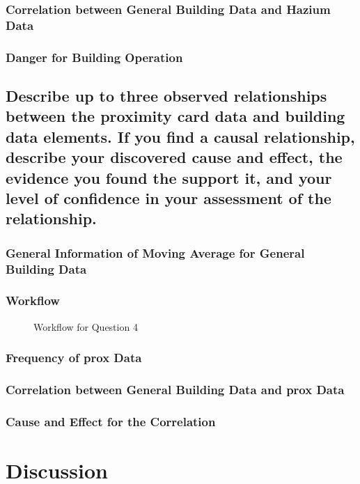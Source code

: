 \documentclass[aps, 10pt, a4paper]{article}
\begin{document}
            \subsubsection{Correlation between General Building Data and Hazium Data}
            
            \subsubsection{Danger for Building Operation}
        
        \subsection[Question 4]{Describe up to three observed relationships between the proximity card data and building data elements. If you find a causal relationship, describe your discovered cause and effect, the evidence you found the support it, and your level of confidence in your assessment of the relationship.}
            \label{sec:question4}
            \subsubsection{General Information of Moving Average for General Building Data}
            
            \subsubsection{Workflow}
                \begin{figure}[htbp]
                    \centering
                    \begin{tikzpicture}[node distance = 2cm, auto]
                    \end{tikzpicture}
                    \caption{Workflow for Question 4}
                    \label{fig:workflow4}
                \end{figure}
            
            \subsubsection{Frequency of prox Data}
            
            \subsubsection{Correlation between General Building Data and prox Data}
            
            \subsubsection{Cause and Effect for the Correlation}
    
    \section{Discussion}
    
    
    
\end{document}
